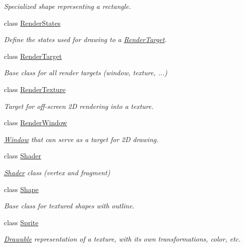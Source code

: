 \begin{DoxyCompactItemize}
\begin{DoxyCompactList}\small\item\em Specialized shape representing a rectangle. \end{DoxyCompactList}\item 
class \hyperlink{classsf_1_1_render_states}{Render\-States}
\begin{DoxyCompactList}\small\item\em Define the states used for drawing to a \hyperlink{classsf_1_1_render_target}{Render\-Target}. \end{DoxyCompactList}\item 
class \hyperlink{classsf_1_1_render_target}{Render\-Target}
\begin{DoxyCompactList}\small\item\em Base class for all render targets (window, texture, ...) \end{DoxyCompactList}\item 
class \hyperlink{classsf_1_1_render_texture}{Render\-Texture}
\begin{DoxyCompactList}\small\item\em Target for off-\/screen 2\-D rendering into a texture. \end{DoxyCompactList}\item 
class \hyperlink{classsf_1_1_render_window}{Render\-Window}
\begin{DoxyCompactList}\small\item\em \hyperlink{classsf_1_1_window}{Window} that can serve as a target for 2\-D drawing. \end{DoxyCompactList}\item 
class \hyperlink{classsf_1_1_shader}{Shader}
\begin{DoxyCompactList}\small\item\em \hyperlink{classsf_1_1_shader}{Shader} class (vertex and fragment) \end{DoxyCompactList}\item 
class \hyperlink{classsf_1_1_shape}{Shape}
\begin{DoxyCompactList}\small\item\em Base class for textured shapes with outline. \end{DoxyCompactList}\item 
class \hyperlink{classsf_1_1_sprite}{Sprite}
\begin{DoxyCompactList}\small\item\em \hyperlink{classsf_1_1_drawable}{Drawable} representation of a texture, with its own transformations, color, etc. \end{DoxyCompactList}\item 

\end{DoxyCompactItemize}
